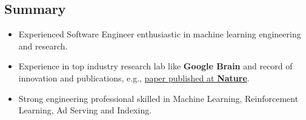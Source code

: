 \documentclass[overlapped]{res}
\begin{document}

\address{
 \href{mailto:e.songhori@gmail.com }{e.songhori(at)gmail.com}\\
 \href{https://www.linkedin.com/in/esonghori/}{linkedin.com/in/esonghori/}\\
 \href{https://github.com/esonghori}{github.com/esonghori}
}

\begin{resume}

\section{Summary}
\begin{itemize}
\item {Experienced Software Engineer enthusiastic in machine learning engineering and research.}
\item {Experience in top industry research lab like {\bf Google Brain} and record of innovation and publications, e.g., \href{https://www.nature.com/articles/s41586-021-03544-w}{paper published at {\bf Nature}}.}
\item {Strong engineering professional skilled in Machine Learning, Reinforcement Learning, Ad Serving and Indexing.}
\end{itemize}

\end{resume}
\end{document}
